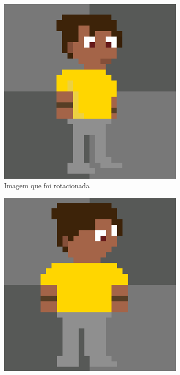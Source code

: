\begin{figure}[htbp]
    \centering
    \caption{\small Processo da utilização 5 da ferramenta de rotação do PixelLab em julho/2025}
    \label{fig:pixelLabRotacao6}

    \begin{subfigure}{0.32\linewidth}
        \includegraphics[width=1\linewidth]{figs/pixelLab/dia2/fix_teste_4.PNG}
        \caption{\small Imagem que foi rotacionada}
        \label{fig:pixelLabRot6a}
    \end{subfigure}
    \begin{subfigure}{0.32\linewidth}
        \includegraphics[width=1\linewidth]{figs/pixelLab/dia2/rot45fix4res1.PNG}

\end{subfigure}
\end{figure}
